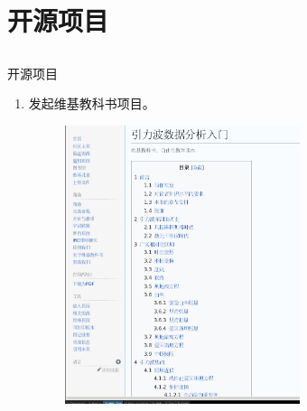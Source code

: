 \documentclass[xcolor=dvipsnames]{beamer} %
\begin{document}
\section{开源项目}
\subsection{}
\begin{frame}{开源项目}
    \vspace{-2mm}
    \begin{enumerate}
        \item 发起维基教科书项目。
        \begin{figure}[htbp!]
            \centering
            \includegraphics[width = 0.65\textwidth]{./pic/GW_book.png}
        \end{figure}
    \end{enumerate} 
\end{frame}
\end{document}
